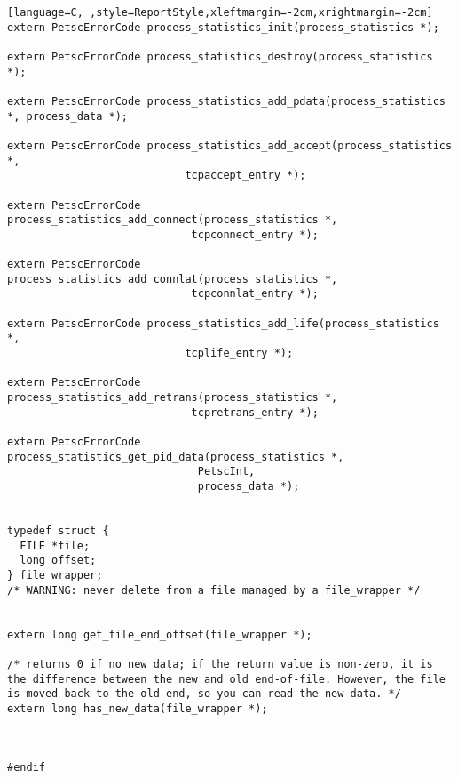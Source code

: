 \documentclass[11pt]{article}
\begin{document}
\begin{lstlisting}[language=C, ,style=ReportStyle,xleftmargin=-2cm,xrightmargin=-2cm]
extern PetscErrorCode process_statistics_init(process_statistics *);

extern PetscErrorCode process_statistics_destroy(process_statistics *);

extern PetscErrorCode process_statistics_add_pdata(process_statistics *, process_data *);

extern PetscErrorCode process_statistics_add_accept(process_statistics *,
						    tcpaccept_entry *);

extern PetscErrorCode process_statistics_add_connect(process_statistics *,
						     tcpconnect_entry *);

extern PetscErrorCode process_statistics_add_connlat(process_statistics *,
						     tcpconnlat_entry *);

extern PetscErrorCode process_statistics_add_life(process_statistics *,
						    tcplife_entry *);

extern PetscErrorCode process_statistics_add_retrans(process_statistics *,
						     tcpretrans_entry *);

extern PetscErrorCode process_statistics_get_pid_data(process_statistics *,
						      PetscInt,
						      process_data *);
						      

typedef struct {
  FILE *file;
  long offset;
} file_wrapper;
/* WARNING: never delete from a file managed by a file_wrapper */


extern long get_file_end_offset(file_wrapper *);

/* returns 0 if no new data; if the return value is non-zero, it is the difference between the new and old end-of-file. However, the file is moved back to the old end, so you can read the new data. */
extern long has_new_data(file_wrapper *);



#endif
\end{lstlisting}
\end{document}
